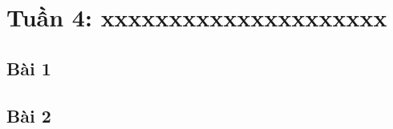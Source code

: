 \documentclass{article}
\begin{document}
\tableofcontents
\newpage
\listoffigures
\newpage
\section{Tuần 4: xxxxxxxxxxxxxxxxxxxxx}
\subsection{Bài 1}


\subsection{Bài 2}


\end{document}

